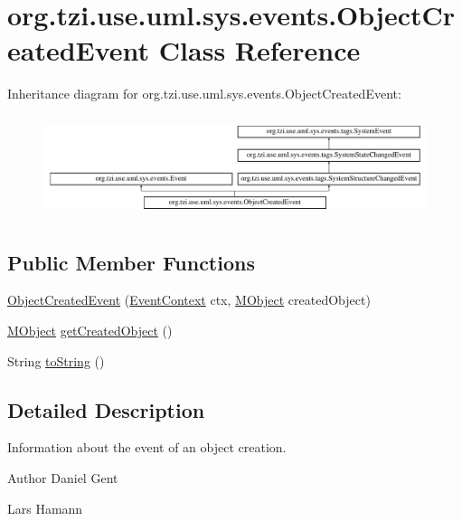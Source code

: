 \hypertarget{classorg_1_1tzi_1_1use_1_1uml_1_1sys_1_1events_1_1_object_created_event}{\section{org.\-tzi.\-use.\-uml.\-sys.\-events.\-Object\-Created\-Event Class Reference}
\label{classorg_1_1tzi_1_1use_1_1uml_1_1sys_1_1events_1_1_object_created_event}
}
Inheritance diagram for org.\-tzi.\-use.\-uml.\-sys.\-events.\-Object\-Created\-Event\-:\begin{figure}[H]
\begin{center}
\leavevmode
\includegraphics[height=3.010753cm]{classorg_1_1tzi_1_1use_1_1uml_1_1sys_1_1events_1_1_object_created_event}
\end{center}
\end{figure}
\subsection*{Public Member Functions}
\begin{DoxyCompactItemize}
\item 
\hyperlink{classorg_1_1tzi_1_1use_1_1uml_1_1sys_1_1events_1_1_object_created_event_ad1d1c6153bb8a51c0c0416047a3fd627}{Object\-Created\-Event} (\hyperlink{enumorg_1_1tzi_1_1use_1_1uml_1_1sys_1_1events_1_1tags_1_1_event_context}{Event\-Context} ctx, \hyperlink{interfaceorg_1_1tzi_1_1use_1_1uml_1_1sys_1_1_m_object}{M\-Object} created\-Object)
\item 
\hyperlink{interfaceorg_1_1tzi_1_1use_1_1uml_1_1sys_1_1_m_object}{M\-Object} \hyperlink{classorg_1_1tzi_1_1use_1_1uml_1_1sys_1_1events_1_1_object_created_event_a8cfb32ab2373dacccacba216d92edd6f}{get\-Created\-Object} ()
\item 
String \hyperlink{classorg_1_1tzi_1_1use_1_1uml_1_1sys_1_1events_1_1_object_created_event_abd0dc03113c5662b123e91170398a28d}{to\-String} ()
\end{DoxyCompactItemize}


\subsection{Detailed Description}
Information about the event of an object creation. \begin{DoxyAuthor}{Author}
Daniel Gent 

Lars Hamann 
\end{DoxyAuthor}


